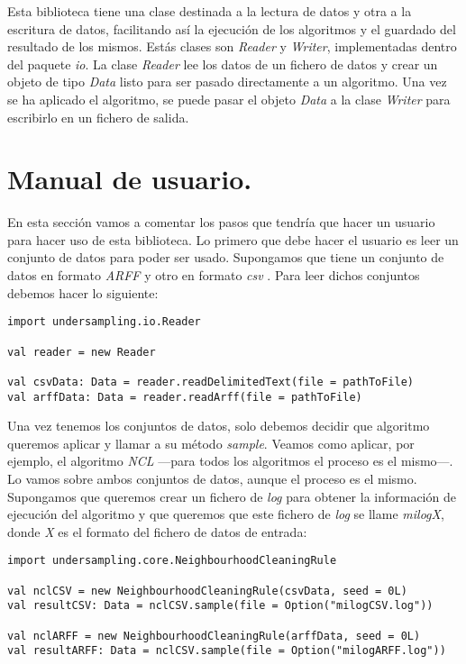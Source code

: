 Esta biblioteca tiene una clase destinada a la lectura de datos y otra a la escritura de datos, facilitando así la ejecución de los algoritmos y el guardado del resultado de los mismos. Estás clases son \textit{Reader} y \textit{Writer}, implementadas dentro del paquete \textit{io}. La clase \textit{Reader} lee los datos de un fichero de datos y crear un objeto de tipo \textit{Data} listo para ser pasado directamente a un algoritmo. Una vez se ha aplicado el algoritmo, se puede pasar el objeto \textit{Data} a la clase \textit{Writer} para escribirlo en un fichero de salida.

\section{Manual de usuario.} \label{sec:manual}

En esta sección vamos a comentar los pasos que tendría que hacer un usuario para hacer uso de esta biblioteca. Lo primero que debe hacer el usuario es leer un conjunto de datos para poder ser usado. Supongamos que tiene un conjunto de datos en formato \textit{ARFF} y otro en formato \textit{csv} \cite{csv}. Para leer dichos conjuntos debemos hacer lo siguiente:

\begin{lstlisting}[frame=single, basicstyle=\scriptsize, breaklines=true]
import undersampling.io.Reader

val reader = new Reader

val csvData: Data = reader.readDelimitedText(file = pathToFile)
val arffData: Data = reader.readArff(file = pathToFile)
\end{lstlisting}

Una vez tenemos los conjuntos de datos, solo debemos decidir que algoritmo queremos aplicar y llamar a su método \textit{sample}. Veamos como aplicar, por ejemplo, el algoritmo \textit{NCL} \cite{ncl} —para todos los algoritmos el proceso es el mismo—. Lo vamos sobre ambos conjuntos de datos, aunque el proceso es el mismo. Supongamos que queremos crear un fichero de \textit{log} para obtener la información de ejecución del algoritmo y que queremos que este fichero de \textit{log} se llame \textit{milogX}, donde \textit{X} es el formato del fichero de datos de entrada:

\begin{lstlisting}[frame=single, basicstyle=\scriptsize, breaklines=true]
import undersampling.core.NeighbourhoodCleaningRule

val nclCSV = new NeighbourhoodCleaningRule(csvData, seed = 0L)
val resultCSV: Data = nclCSV.sample(file = Option("milogCSV.log"))

val nclARFF = new NeighbourhoodCleaningRule(arffData, seed = 0L)
val resultARFF: Data = nclCSV.sample(file = Option("milogARFF.log"))
\end{lstlisting}

